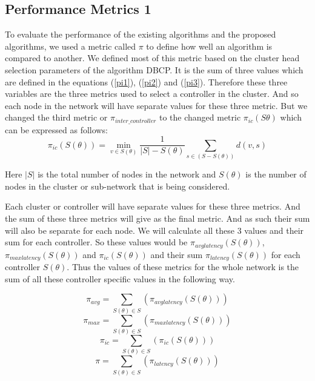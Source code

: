 \documentclass[10pt]{extarticle}
\begin{document}
	\subsection{Performance Metrics 1} \label{perfm}
	
	To evaluate the performance of the existing algorithms and the proposed algorithms, we used a metric called $\pi$ to define how well an algorithm is compared to another. We defined most of this metric based on the cluster head selection parameters of the algorithm DBCP. It is the sum of three values which are defined in the equations (\ref{pi1}), (\ref{pi2}) and (\ref{pi3}). Therefore these three variables are the three metrics used to select a controller in the cluster. And so each node in the network will have separate values for these three metric. But we changed the third metric or $\pi_{inter\_controller}$ to the changed metric $\pi_{ic}(S\theta)$ which can be expressed as follows:
	\begin{equation}
	\pi_{ic}(S(\theta)) = \min_{v\in S(\theta)} \frac{1}{|S|-S(\theta)} \sum_{s\in (S-S(\theta))}d(v,s)
	\end{equation}
	
	Here $|S|$ is the total number of nodes in the network and $S(\theta)$ is the number of nodes in the cluster or sub-network that is being considered.
	
	Each cluster or controller will have separate values for these three metrics. And the sum of these three metrics will give as the final metric. And as such their sum will also be separate for each node. We will calculate all these 3 values and their sum for each controller. So these values would be $\pi_{avglatency}(S(\theta))$, $\pi_{maxlatency}(S(\theta))$ and $\pi_{ic}(S(\theta))$ and their sum $\pi_{latency}(S(\theta))$ for each controller $S(\theta)$. Thus the values of these metrics for the whole network is the sum of all these controller specific values in the following way.
	
	\begin{equation}
	\pi_{avg} = \sum_{S(\theta)\in S}(\pi_{avglatency}(S(\theta)))
	\end{equation}
	\begin{equation}
	\pi_{max} = \sum_{S(\theta)\in S}(\pi_{maxlatency}(S(\theta)))
	\end{equation}
	\begin{equation}
	\pi_{ic} = \sum_{S(\theta)\in S}(\pi_{ic}(S(\theta)))
	\end{equation}
	\begin{equation}	\label{final}
	\pi = \sum_{S(\theta)\in S}(\pi_{latency}(S(\theta)))
	\end{equation}
	
\end{document}
